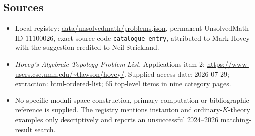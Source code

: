\documentclass[11pt]{article}
\begin{document}
\subsection{Sources}
\begin{itemize}
\item Local registry: \url{data/unsolvedmath/problems.json}, permanent UnsolvedMath ID $11100026$, exact source code \texttt{catalogue entry}, attributed to Mark Hovey with the suggestion credited to Neil Strickland.
\item \emph{Hovey's Algebraic Topology Problem List}, Applications item 2: \url{https://www-users.cse.umn.edu/~tlawson/hovey/}. Supplied access date: 2026-07-29; extraction: html-ordered-list; 65 top-level items in nine category pages.
\item No specific moduli-space construction, primary computation or bibliographic reference is supplied. The registry mentions instanton and ordinary-$K$-theory examples only descriptively and reports an unsuccessful 2024--2026 matching-result search.
\end{itemize}
\end{document}
